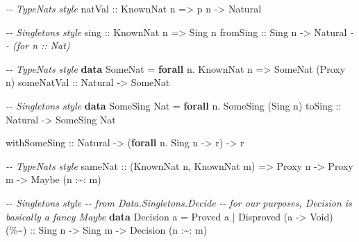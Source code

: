 \documentclass[]{article}
\newenvironment{Shaded}{}{}
\newcommand{\CommentTok}[1]{\textcolor[rgb]{0.38,0.63,0.69}{\textit{#1}}}
\newcommand{\DataTypeTok}[1]{\textcolor[rgb]{0.56,0.13,0.00}{#1}}
\newcommand{\KeywordTok}[1]{\textcolor[rgb]{0.00,0.44,0.13}{\textbf{#1}}}
\newcommand{\NormalTok}[1]{#1}
\newcommand{\OperatorTok}[1]{\textcolor[rgb]{0.40,0.40,0.40}{#1}}
\newcommand{\OtherTok}[1]{\textcolor[rgb]{0.00,0.44,0.13}{#1}}
\begin{document}
\begin{Shaded}
\begin{Highlighting}[]
\CommentTok{{-}{-} TypeNats style}
\OtherTok{natVal ::} \DataTypeTok{KnownNat}\NormalTok{ n }\OtherTok{=>}\NormalTok{ p n }\OtherTok{{-}>} \DataTypeTok{Natural}

\CommentTok{{-}{-} Singletons style}
\OtherTok{sing     ::} \DataTypeTok{KnownNat}\NormalTok{ n }\OtherTok{=>} \DataTypeTok{Sing}\NormalTok{ n}
\OtherTok{fromSing ::} \DataTypeTok{Sing}\NormalTok{ n }\OtherTok{{-}>} \DataTypeTok{Natural}       \CommentTok{{-}{-} (for n :: Nat)}

\CommentTok{{-}{-} TypeNats style}
\KeywordTok{data} \DataTypeTok{SomeNat} \OtherTok{=} \KeywordTok{forall}\NormalTok{ n}\OperatorTok{.} \DataTypeTok{KnownNat}\NormalTok{ n }\OtherTok{=>} \DataTypeTok{SomeNat}\NormalTok{ (}\DataTypeTok{Proxy}\NormalTok{ n)}
\OtherTok{someNatVal ::} \DataTypeTok{Natural} \OtherTok{{-}>} \DataTypeTok{SomeNat}

\CommentTok{{-}{-} Singletons style}
\KeywordTok{data} \DataTypeTok{SomeSing} \DataTypeTok{Nat} \OtherTok{=} \KeywordTok{forall}\NormalTok{ n}\OperatorTok{.} \DataTypeTok{SomeSing}\NormalTok{ (}\DataTypeTok{Sing}\NormalTok{ n)}
\OtherTok{toSing ::} \DataTypeTok{Natural} \OtherTok{{-}>} \DataTypeTok{SomeSing} \DataTypeTok{Nat}

\OtherTok{withSomeSing ::} \DataTypeTok{Natural} \OtherTok{{-}>}\NormalTok{ (}\KeywordTok{forall}\NormalTok{ n}\OperatorTok{.} \DataTypeTok{Sing}\NormalTok{ n }\OtherTok{{-}>}\NormalTok{ r) }\OtherTok{{-}>}\NormalTok{ r}

\CommentTok{{-}{-} TypeNats style}
\OtherTok{sameNat ::}\NormalTok{ (}\DataTypeTok{KnownNat}\NormalTok{ n, }\DataTypeTok{KnownNat}\NormalTok{ m) }\OtherTok{=>} \DataTypeTok{Proxy}\NormalTok{ n }\OtherTok{{-}>} \DataTypeTok{Proxy}\NormalTok{ m }\OtherTok{{-}>} \DataTypeTok{Maybe}\NormalTok{ (n }\OperatorTok{:\textasciitilde{}:}\NormalTok{ m)}

\CommentTok{{-}{-} Singletons style}
\CommentTok{{-}{-} from Data.Singletons.Decide}
\CommentTok{{-}{-} for our purposes, Decision is basically a fancy Maybe}
\KeywordTok{data} \DataTypeTok{Decision}\NormalTok{ a }\OtherTok{=} \DataTypeTok{Proved}\NormalTok{ a }\OperatorTok{|} \DataTypeTok{Disproved}\NormalTok{ (a }\OtherTok{{-}>} \DataTypeTok{Void}\NormalTok{)}
\OtherTok{(\%\textasciitilde{}) ::} \DataTypeTok{Sing}\NormalTok{ n }\OtherTok{{-}>} \DataTypeTok{Sing}\NormalTok{ m }\OtherTok{{-}>} \DataTypeTok{Decision}\NormalTok{ (n }\OperatorTok{:\textasciitilde{}:}\NormalTok{ m)}
\end{Highlighting}
\end{Shaded}
\end{document}
